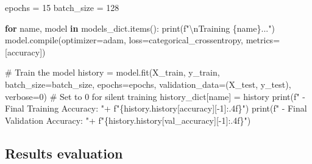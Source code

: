 \documentclass[
]{IEEEtran}
\newenvironment{Shaded}{\begin{snugshade}}{\end{snugshade}}
\newcommand{\BuiltInTok}[1]{\textcolor[rgb]{0.00,0.23,0.31}{#1}}
\newcommand{\CharTok}[1]{\textcolor[rgb]{0.13,0.47,0.30}{#1}}
\newcommand{\CommentTok}[1]{\textcolor[rgb]{0.37,0.37,0.37}{#1}}
\newcommand{\ControlFlowTok}[1]{\textcolor[rgb]{0.00,0.23,0.31}{\textbf{#1}}}
\newcommand{\DecValTok}[1]{\textcolor[rgb]{0.68,0.00,0.00}{#1}}
\newcommand{\KeywordTok}[1]{\textcolor[rgb]{0.00,0.23,0.31}{\textbf{#1}}}
\newcommand{\NormalTok}[1]{\textcolor[rgb]{0.00,0.23,0.31}{#1}}
\newcommand{\OperatorTok}[1]{\textcolor[rgb]{0.37,0.37,0.37}{#1}}
\newcommand{\SpecialCharTok}[1]{\textcolor[rgb]{0.37,0.37,0.37}{#1}}
\newcommand{\SpecialStringTok}[1]{\textcolor[rgb]{0.13,0.47,0.30}{#1}}
\newcommand{\StringTok}[1]{\textcolor[rgb]{0.13,0.47,0.30}{#1}}
\begin{document}
\begin{Shaded}
\begin{Highlighting}[]
\NormalTok{epochs }\OperatorTok{=} \DecValTok{15}
\NormalTok{batch\_size }\OperatorTok{=} \DecValTok{128}


\ControlFlowTok{for}\NormalTok{ name, model }\KeywordTok{in}\NormalTok{ models\_dict.items():}
    \BuiltInTok{print}\NormalTok{(}\SpecialStringTok{f"}\CharTok{\textbackslash{}n}\SpecialStringTok{Training }\SpecialCharTok{\{}\NormalTok{name}\SpecialCharTok{\}}\SpecialStringTok{..."}\NormalTok{)}
\NormalTok{    model.}\BuiltInTok{compile}\NormalTok{(optimizer}\OperatorTok{=}\StringTok{\textquotesingle{}adam\textquotesingle{}}\NormalTok{,}
\NormalTok{                  loss}\OperatorTok{=}\StringTok{\textquotesingle{}categorical\_crossentropy\textquotesingle{}}\NormalTok{,}
\NormalTok{                  metrics}\OperatorTok{=}\NormalTok{[}\StringTok{\textquotesingle{}accuracy\textquotesingle{}}\NormalTok{])}
    
    \CommentTok{\# Train the model}
\NormalTok{    history }\OperatorTok{=}\NormalTok{ model.fit(X\_train, y\_train,}
\NormalTok{                        batch\_size}\OperatorTok{=}\NormalTok{batch\_size,}
\NormalTok{                        epochs}\OperatorTok{=}\NormalTok{epochs,}
\NormalTok{                        validation\_data}\OperatorTok{=}\NormalTok{(X\_test, y\_test),}
\NormalTok{                        verbose}\OperatorTok{=}\DecValTok{0}\NormalTok{) }\CommentTok{\# Set to 0 for silent training}
\NormalTok{    history\_dict[name] }\OperatorTok{=}\NormalTok{ history}
    \BuiltInTok{print}\NormalTok{(}\SpecialStringTok{f"  {-} Final Training Accuracy: "}\OperatorTok{+}
          \SpecialStringTok{f"}\SpecialCharTok{\{}\NormalTok{history}\SpecialCharTok{.}\NormalTok{history[}\StringTok{\textquotesingle{}accuracy\textquotesingle{}}\NormalTok{][}\OperatorTok{{-}}\DecValTok{1}\NormalTok{]}\SpecialCharTok{:.4f\}}\SpecialStringTok{"}\NormalTok{)}
    \BuiltInTok{print}\NormalTok{(}\SpecialStringTok{f"  {-} Final Validation Accuracy: "}\OperatorTok{+}
          \SpecialStringTok{f"}\SpecialCharTok{\{}\NormalTok{history}\SpecialCharTok{.}\NormalTok{history[}\StringTok{\textquotesingle{}val\_accuracy\textquotesingle{}}\NormalTok{][}\OperatorTok{{-}}\DecValTok{1}\NormalTok{]}\SpecialCharTok{:.4f\}}\SpecialStringTok{"}\NormalTok{)}
\end{Highlighting}
\end{Shaded}

\subsection{Results evaluation}\label{results-evaluation}
\end{document}
